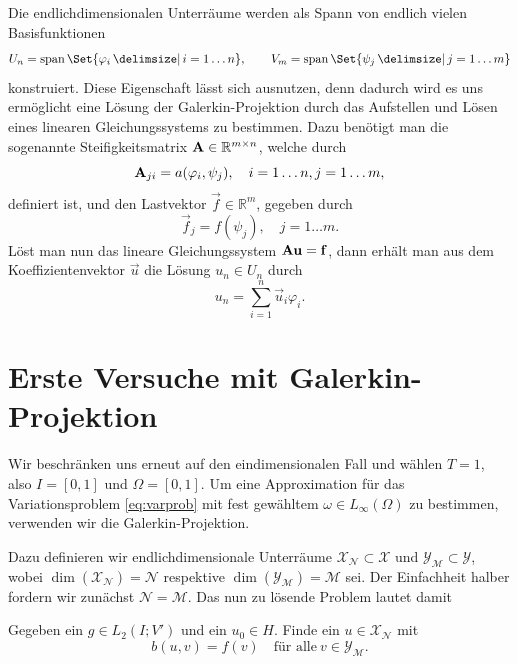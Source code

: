 Die endlichdimensionalen Unterräume werden als Spann von endlich vielen Basisfunktionen
\begin{equation}
    U_{n} = \spn\Set{\varphi_{i} \given i = 1 \dots n},
    \qquad
    V_{m} = \spn\Set{ \psi_{j} \given j = 1 \dots m}
\end{equation}
konstruiert.
Diese Eigenschaft lässt sich ausnutzen, denn dadurch wird es uns ermöglicht eine Lösung der Galerkin-Projektion durch das Aufstellen und Lösen eines linearen Gleichungssystems zu bestimmen.
Dazu benötigt man die sogenannte Steifigkeitsmatrix $\mathbf{A} \in \mathbb{R}^{m \times n}$, welche durch
\begin{equation}
    \mathbf{A}_{ji} = a(\varphi_{i}, \psi_{j}), \quad i = 1 \dots n, j = 1 \dots m,
\end{equation}
definiert ist, und den Lastvektor $\vec f \in \mathbb{R}^{m}$, gegeben durch
\begin{equation}
    \vec f_{j} = f(\psi_{j}), \quad j = 1 \dots m.
\end{equation}
Löst man nun das lineare Gleichungssystem $\mathbf{A} \mathbf{u} = \mathbf{f}$, dann erhält man aus dem Koeffizientenvektor $\vec u$ die Lösung $u_{n} \in U_{n}$ durch
\begin{equation}
    u_{n} = \sum_{i = 1}^{n} \vec u_{i} \varphi_{i}.
\end{equation}


\section{Erste Versuche mit Galerkin-Projektion} %
\label{sec:erste_versuche_mit_galerkin_projektion}

Wir beschränken uns erneut auf den eindimensionalen Fall und wählen $T = 1$, also $I = [0, 1]$ und $\Omega = [0 ,1]$.
Um eine Approximation für das Variationsproblem \eqref{eq:varprob} mit fest gewähltem $\omega \in L_{\infty}(\Omega)$ zu bestimmen, verwenden wir die Galerkin-Projektion.

Dazu definieren wir endlichdimensionale Unterräume $\mathcal X_{\mathcal N} \subset \mathcal X$ und $\mathcal Y_{\mathcal M} \subset \mathcal Y$, wobei $\dim(\mathcal X_{\mathcal N}) = \mathcal N$ respektive $\dim(\mathcal Y_{\mathcal M}) = \mathcal M$ sei.
Der Einfachheit halber fordern wir zunächst $\mathcal N = \mathcal M$.
Das nun zu lösende Problem lautet damit

\begin{Problem}
    Gegeben ein $g \in L_{2}(I; V')$ und ein $u_{0} \in H$. Finde ein $u \in \mathcal X_{\mathcal N}$ mit
    \begin{equation}
        \label{eq:varprob_3}
        b(u, v) = f(v) \quad \text{für alle}~v \in \mathcal Y_{\mathcal M}.
    \end{equation}
\end{Problem}

